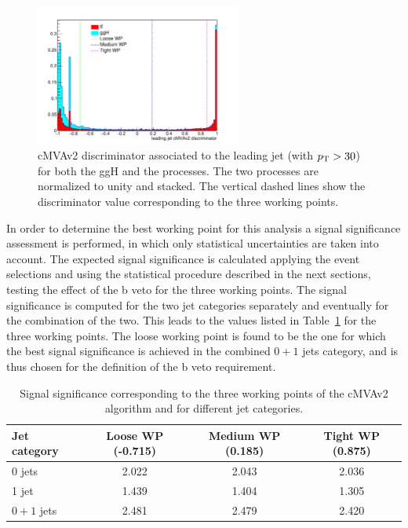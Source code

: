 \begin{figure}[htb]
\centering
\includegraphics[width=0.6\textwidth]{images/13TeV/cmva_WP.pdf}
\caption{cMVAv2 discriminator associated to the leading jet (with $p_\mathrm{T} > 30$\GeV) for both the ggH and the \ttbar processes. The two processes are normalized to unity and stacked. The vertical dashed lines show the discriminator value corresponding to the three working points.}\label{fig:discriminator}
\end{figure}

In order to determine the best working point for this analysis a signal significance assessment is performed, in which only statistical uncertainties are taken into account. The expected signal significance is calculated applying the event selections and using the statistical procedure described in the next sections, testing the effect of the b veto for the three working points.
The signal significance is computed for the two jet categories separately and eventually for the combination of the two. This leads to the values listed in Table~\ref{tab:significance_wp_combine} for the three working points. The loose working point is found to be the one for which the best signal significance is achieved in the combined $0+1$ jets category, and is thus chosen for the definition of the b veto requirement.

\begin{table}
\caption{Signal significance corresponding to the three working points of the cMVAv2 algorithm and for
different jet categories.\label{tab:significance_wp_combine}}
\begin{center}
\begin{tabular}{lccc}
\toprule
Jet category & Loose WP (-0.715) & Medium WP (0.185) & Tight WP (0.875) \\
\midrule
0 jets & 2.022 & 2.043 & 2.036 \\
1 jet & 1.439 & 1.404 & 1.305 \\
$0+1$ jets & 2.481 & 2.479 & 2.420 \\
\bottomrule
\end{tabular}
\end{center}
\end{table}

